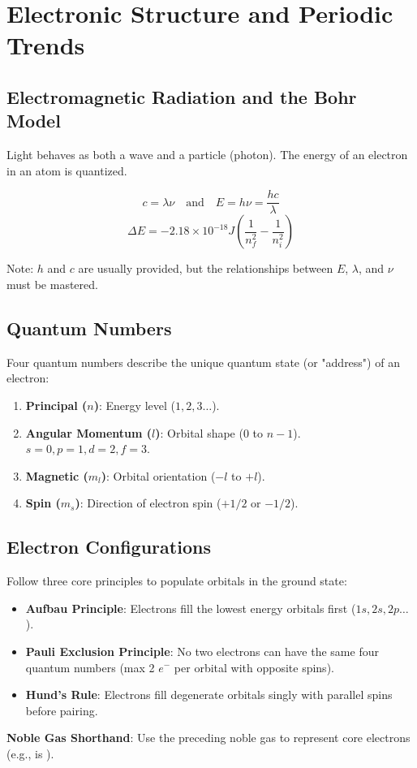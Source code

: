 \documentclass[11pt]{article}
\begin{document}
\newpage

\section{Electronic Structure and Periodic Trends}

\subsection{Electromagnetic Radiation and the Bohr Model}
Light behaves as both a wave and a particle (photon). The energy of an electron in an atom is quantized.
\begin{tcolorbox}[memorize, title=Light and Photon Energy (Must Memorize)]
    \[ c = \lambda \nu \quad \text{and} \quad E = h\nu = \frac{hc}{\lambda} \]
    \[ \Delta E = -2.18 \times 10^{-18} \si{J} \left( \frac{1}{n_f^2} - \frac{1}{n_i^2} \right) \]
\end{tcolorbox}
Note: $h$ and $c$ are usually provided, but the relationships between $E$, $\lambda$, and $\nu$ must be mastered.

\subsection{Quantum Numbers}
Four quantum numbers describe the unique quantum state (or "address") of an electron:
\begin{enumerate}
    \item \textbf{Principal ($n$)}: Energy level ($1, 2, 3 \dots$).
    \item \textbf{Angular Momentum ($l$)}: Orbital shape ($0$ to $n-1$). $s=0, p=1, d=2, f=3$.
    \item \textbf{Magnetic ($m_l$)}: Orbital orientation ($-l$ to $+l$).
    \item \textbf{Spin ($m_s$)}: Direction of electron spin ($+1/2$ or $-1/2$).
\end{enumerate}

\subsection{Electron Configurations}
Follow three core principles to populate orbitals in the ground state:
\begin{itemize}
    \item \textbf{Aufbau Principle}: Electrons fill the lowest energy orbitals first ($1s, 2s, 2p \dots$).
    \item \textbf{Pauli Exclusion Principle}: No two electrons can have the same four quantum numbers (max 2 $e^-$ per orbital with opposite spins).
    \item \textbf{Hund's Rule}: Electrons fill degenerate orbitals singly with parallel spins before pairing.
\end{itemize}
\textbf{Noble Gas Shorthand}: Use the preceding noble gas to represent core electrons (e.g.,  is ).
\end{document}
